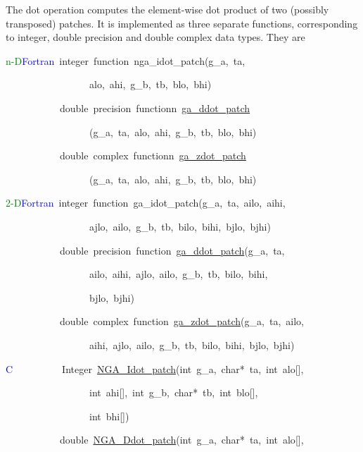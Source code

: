 The dot operation computes the element-wise dot product of two (possibly
transposed) patches. It is implemented as three separate functions,
corresponding to integer, double precision and double complex data
types. They are

\textcolor{green}{n-D}\textcolor{blue}{Fortran}~integer~function~nga\_idot\_patch(g\_a,~ta,~

~~~~~~~~~~~~~~~~~alo,~ahi,~g\_b,~tb,~blo,~bhi)~

~~~~~~~~~~~double~precision~functionn~\href{https://hpc.pnl.gov/globalarrays/api/f_op_api.html\#ga_ddot_patch}{ga\_{}ddot\_{}patch}

~~~~~~~~~~~~~~~~~(g\_a,~ta,~alo,~ahi,~g\_b,~tb,~blo,~bhi)~

~~~~~~~~~~~double~complex~functionn~\href{https://hpc.pnl.gov/globalarrays/api/f_op_api.html\#ga_zdot_patch}{ga\_{}zdot\_{}patch}

~~~~~~~~~~~~~~~~~(g\_a,~ta,~alo,~ahi,~g\_b,~tb,~blo,~bhi)



\textcolor{green}{2-D}\textcolor{blue}{Fortran}~integer~function~ga\_idot\_patch(g\_a,~ta,~ailo,~aihi,

~~~~~~~~~~~~~~~~~ajlo,~ailo,~g\_b,~tb,~bilo,~bihi,~bjlo,~bjhi)~

~~~~~~~~~~~double~precision~function~\href{https://hpc.pnl.gov/globalarrays/api/f_op_api.html\#ga_ddot_patch}{ga\_{}ddot\_{}patch}(g\_a,~ta,~

~~~~~~~~~~~~~~~~~ailo,~aihi,~ajlo,~ailo,~g\_b,~tb,~bilo,~bihi,~

~~~~~~~~~~~~~~~~~bjlo,~bjhi)~

~~~~~~~~~~~double~complex~function~\href{https://hpc.pnl.gov/globalarrays/api/f_op_api.html\#ga_zdot_patch}{ga\_{}zdot\_{}patch}(g\_a,~ta,~ailo,~

~~~~~~~~~~~~~~~~~aihi,~ajlo,~ailo,~g\_b,~tb,~bilo,~bihi,~bjlo,~bjhi)



\textcolor{blue}{C}~~~~~~~~~~Integer~\href{https://hpc.pnl.gov/globalarrays/api/c_op_api.html\#ga_dot_patch}{NGA\_{}Idot\_{}patch}(int~g\_a,~char{*}~ta,~int~alo{[}{]},~

~~~~~~~~~~~~~~~~~int~ahi{[}{]},~int~g\_b,~char{*}~tb,~int~blo{[}{]},~

~~~~~~~~~~~~~~~~~int~bhi{[}{]})~

~~~~~~~~~~~double~\href{https://hpc.pnl.gov/globalarrays/api/c_op_api.html\#ga_dot_patch}{NGA\_{}Ddot\_{}patch}(int~g\_a,~char{*}~ta,~int~alo{[}{]},~

